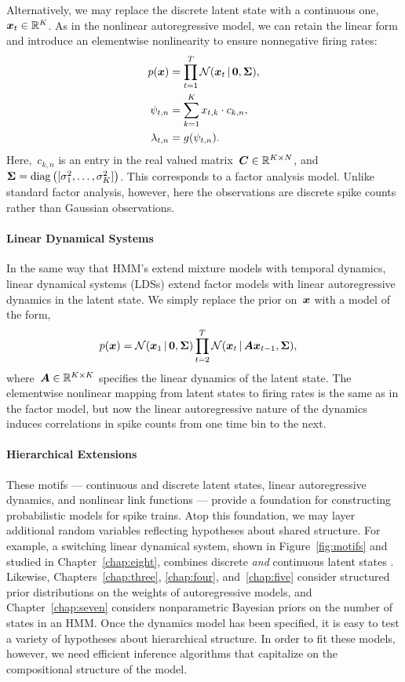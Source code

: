 Alternatively, we may replace the discrete latent state with a continuous
one,~$\boldsymbol{x}_t \in \mathbb{R}^K$. As in the nonlinear autoregressive model,
we can retain the linear form and introduce an elementwise nonlinearity
to ensure nonnegative firing rates:
\begin{align*}
  p(\boldsymbol{x}) &= \prod_{t=1}^T \mathcal{N}(\boldsymbol{x}_t \,|\, \boldsymbol{0}, \boldsymbol{\Sigma}), \\
  \psi_{t,n} &= \sum_{k=1}^K x_{t,k} \cdot c_{k,n}, \\
  \lambda_{t,n} &= g(\psi_{t,n}).
\end{align*}
Here,~$c_{k,n}$ is an entry in the real valued matrix~$\boldsymbol{C} \in
\mathbb{R}^{K \times N}$, and~${\boldsymbol{\Sigma} = \mathrm{diag} \left([ \sigma^2_1,
    \ldots, \sigma^2_K ] \right)}$.  This corresponds to a factor
analysis model. Unlike standard factor analysis, however, here the
observations are discrete spike counts rather than Gaussian
observations.

\paragraph{Linear Dynamical Systems}
In the same way that HMM's extend mixture models with temporal
dynamics, linear dynamical systems (LDSs) extend factor models with
linear autoregressive dynamics in the latent state.  We simply replace
the prior on~$\boldsymbol{x}$ with a model of the form,
\begin{align*}
  p(\boldsymbol{x}) &= \mathcal{N}(\boldsymbol{x}_1 \,|\, \boldsymbol{0}, \boldsymbol{\Sigma}) \prod_{t=2}^T \mathcal{N}(\boldsymbol{x}_t \,|\, \boldsymbol{A} \boldsymbol{x}_{t-1}, \boldsymbol{\Sigma}),
\end{align*}
where~$\boldsymbol{A} \in \mathbb{R}^{K \times K}$ specifies the linear dynamics of
the latent state.  The elementwise nonlinear mapping from latent
states to firing rates is the same as in the factor model, but now the
linear autoregressive nature of the dynamics induces correlations in
spike counts from one time bin to the next.


\paragraph{Hierarchical Extensions}
These motifs --- continuous and discrete latent states, linear autoregressive 
dynamics, and nonlinear link functions --- provide a foundation for 
constructing probabilistic models for spike trains. Atop this foundation,
we may layer additional random variables reflecting hypotheses about shared 
structure. For example, a switching linear dynamical system, shown in Figure~\ref{fig:motifs}
and studied in Chapter~\ref{chap:eight},
combines discrete \emph{and} continuous latent states \citep{murphy2012probabilistic, fox2009bayesian}. 
Likewise, Chapters~\ref{chap:three}, \ref{chap:four},
and~\ref{chap:five} consider structured prior distributions on 
the weights of autoregressive models, and Chapter~\ref{chap:seven} considers 
nonparametric Bayesian priors on the number of states in an HMM. Once the 
dynamics model has been specified, it is easy to test a variety of hypotheses
about hierarchical structure. In order to fit these models, however, we need 
efficient inference algorithms that capitalize on the compositional structure 
of the model.


